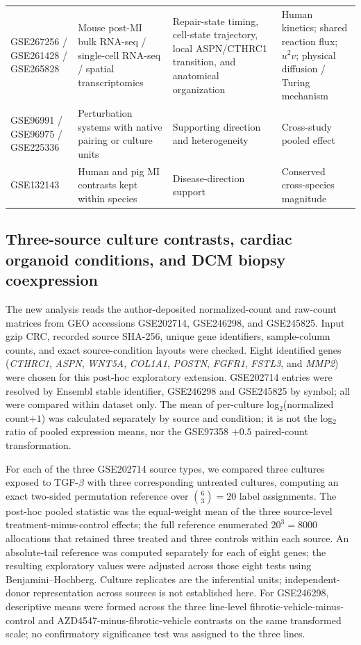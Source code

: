\documentclass[preprint,11pt]{elsarticle}
\begin{document}
\begin{table}[H]
\begin{tabularx}{\linewidth}{p{2.0cm}p{2.6cm}YY}
GSE267256 / GSE261428 / GSE265828 & Mouse post-MI bulk RNA-seq / single-cell RNA-seq / spatial transcriptomics & Repair-state timing, cell-state trajectory, local ASPN/CTHRC1 transition, and anatomical organization & Human kinetics; shared reaction flux; $u^2v$; physical diffusion / Turing mechanism\\
GSE96991 / GSE96975 / GSE225336 & Perturbation systems with native pairing or culture units & Supporting direction and heterogeneity & Cross-study pooled effect\\
GSE132143 & Human and pig MI contrasts kept within species & Disease-direction support & Conserved cross-species magnitude\\
\bottomrule
\end{tabularx}
\end{table}


\subsection{Three-source culture contrasts, cardiac organoid conditions, and DCM biopsy coexpression}
The new analysis reads the author-deposited normalized-count and raw-count matrices from GEO accessions GSE202714, GSE246298, and GSE245825. Input gzip CRC, recorded source SHA-256, unique gene identifiers, sample-column counts, and exact source-condition layouts were checked. Eight identified genes (\textit{CTHRC1}, \textit{ASPN}, \textit{WNT5A}, \textit{COL1A1}, \textit{POSTN}, \textit{FGFR1}, \textit{FSTL3}, and \textit{MMP2}) were chosen for this post-hoc exploratory extension. GSE202714 entries were resolved by Ensembl stable identifier, GSE246298 and GSE245825 by symbol; all were compared within dataset only. The mean of per-culture log$_2$(normalized count$+1$) was calculated separately by source and condition; it is not the log$_2$ ratio of pooled expression means, nor the GSE97358 $+0.5$ paired-count transformation.

For each of the three GSE202714 source types, we compared three cultures exposed to TGF-$\beta$ with three corresponding untreated cultures, computing an exact two-sided permutation reference over $\binom{6}{3}=20$ label assignments. The post-hoc pooled statistic was the equal-weight mean of the three source-level treatment-minus-control effects; the full reference enumerated $20^3=8000$ allocations that retained three treated and three controls within each source. An absolute-tail reference was computed separately for each of eight genes; the resulting exploratory values were adjusted across those eight tests using Benjamini--Hochberg. Culture replicates are the inferential units; independent-donor representation across sources is not established here. For GSE246298, descriptive means were formed across the three line-level fibrotic-vehicle-minus-control and AZD4547-minus-fibrotic-vehicle contrasts on the same transformed scale; no confirmatory significance test was assigned to the three lines.
\end{document}
